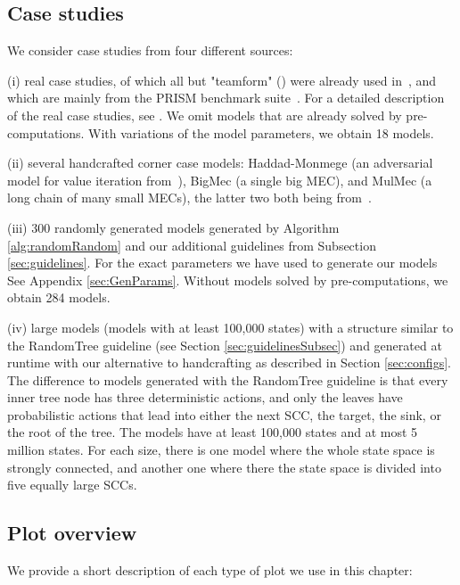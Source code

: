 \subsection{Case studies} \label{subsec:casestudies}
We consider case studies from four different sources: 

(i) real case studies, of which all but "teamform" (\cite{teamform}) were already used in~\cite{gandalf}, and which are mainly from the PRISM benchmark suite~\cite{PRISMben}.
For a detailed description of the real case studies, see \cite[Appendix C.1]{gandalf}.
We omit models that are already solved by pre-computations.
With variations of the model parameters, we obtain 18 models.

(ii) several handcrafted corner case models: Haddad-Monmege (an adversarial model for value iteration from~\cite{haddadmonmege}), BigMec (a single big MEC), and MulMec (a long chain of many small MECs), the latter two both being from~\cite{gandalf}.

(iii) 300 randomly generated models generated by Algorithm \ref{alg:randomRandom} and our additional guidelines from Subsection \ref{sec:guidelines}.
For the exact parameters we have used to generate our models See Appendix \ref{sec:GenParams}. Without models solved by pre-computations, we obtain 284 models.

(iv) large models (models with at least 100,000 states) with a structure similar to the RandomTree guideline (see Section \ref{sec:guidelinesSubsec}) and generated at runtime with our alternative to handcrafting as described in Section \ref{sec:configs}.
The difference to models generated with the RandomTree guideline is that every inner tree node has three deterministic actions, and only the leaves have probabilistic actions that lead into either the next SCC, the target, the sink, or the root of the tree.
The models have at least 100,000 states and at most 5 million states. For each size, there is one model where the whole state space is strongly connected, and another one where there the state space is divided into five equally large SCCs.

\subsection{Plot overview} \label{subsec:plots}
We provide a short description of each type of plot we use in this chapter:
